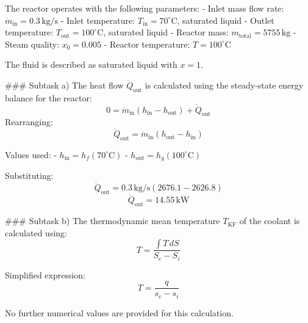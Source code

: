 The reactor operates with the following parameters:  
- Inlet mass flow rate: \( \dot{m}_{\text{in}} = 0.3 \, \text{kg/s} \)  
- Inlet temperature: \( T_{\text{in}} = 70^\circ\text{C} \), saturated liquid  
- Outlet temperature: \( T_{\text{out}} = 100^\circ\text{C} \), saturated liquid  
- Reactor mass: \( m_{\text{total}} = 5755 \, \text{kg} \)  
- Steam quality: \( x_0 = 0.005 \)  
- Reactor temperature: \( T = 100^\circ\text{C} \)  

The fluid is described as saturated liquid with \( x = 1 \).  

### Subtask a)  
The heat flow \( \dot{Q}_{\text{out}} \) is calculated using the steady-state energy balance for the reactor:  
\[
0 = \dot{m}_{\text{in}} \left( h_{\text{in}} - h_{\text{out}} \right) + \dot{Q}_{\text{out}}
\]  
Rearranging:  
\[
\dot{Q}_{\text{out}} = \dot{m}_{\text{in}} \left( h_{\text{out}} - h_{\text{in}} \right)
\]  

Values used:  
- \( h_{\text{in}} = h_f(70^\circ\text{C}) \)  
- \( h_{\text{out}} = h_g(100^\circ\text{C}) \)  

Substituting:  
\[
\dot{Q}_{\text{out}} = 0.3 \, \text{kg/s} \left( 2676.1 - 2626.8 \right)
\]  
\[
\dot{Q}_{\text{out}} = 14.55 \, \text{kW}
\]  

### Subtask b)  
The thermodynamic mean temperature \( T_{\text{KF}} \) of the coolant is calculated using:  
\[
T = \frac{\int T \, dS}{S_e - S_i}
\]  

Simplified expression:  
\[
T = \frac{q}{s_e - s_i}
\]  

No further numerical values are provided for this calculation.